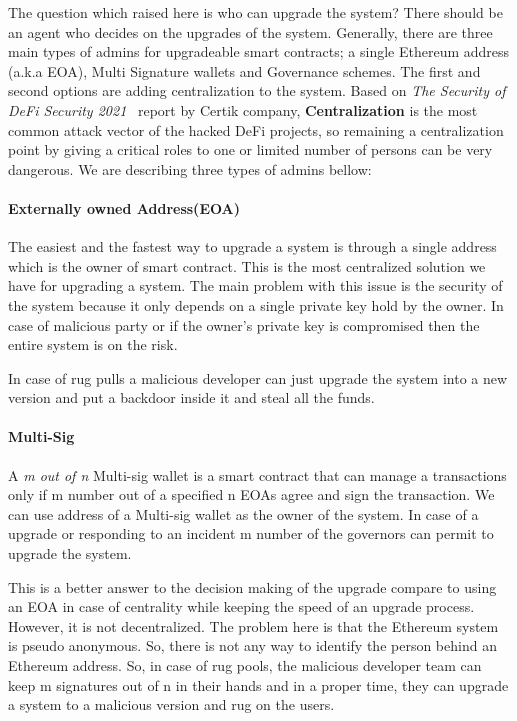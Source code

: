 
The question which raised here is who can upgrade the system? There should be an agent who decides on the upgrades of the system. Generally, there are three main types of admins for upgradeable smart contracts; a single Ethereum address (a.k.a EOA), Multi Signature wallets and Governance schemes. The first and second options are adding centralization to the system. Based on \textit{The Security of DeFi Security 2021}~\cite{certikReport} report by Certik company, \textbf{Centralization} is the most common attack vector of the hacked DeFi projects, so remaining a centralization point by giving a critical roles to one or limited number of persons can be very dangerous.
We are describing three types of admins bellow:


 \paragraph{Externally owned Address(EOA)}
The easiest and the fastest way to upgrade a system is through a single address which is the owner of smart contract. This is the most centralized solution we have for upgrading a system. The main problem with this issue is the security of the system because it only depends on a single private key hold by the owner. In case of malicious party or if the owner's private key is compromised then the entire system is on the risk.

In case of rug pulls a malicious developer can just upgrade the system into a new version and put a backdoor inside it and steal all the funds.
 \paragraph{Multi-Sig}
 A \textit{m out of n} Multi-sig wallet is a smart contract that can manage a transactions only if m number out of a specified n EOAs agree and sign the transaction. We can use address of a Multi-sig wallet as the owner of the system. In case of a upgrade or responding to an incident m number of the governors can permit to upgrade the system.

 This is a better answer to the decision making of the upgrade compare to using an EOA in case of centrality while keeping the speed of an upgrade process. However, it is not decentralized. The problem here is that the Ethereum system is pseudo anonymous. So, there is not any way to identify the person behind an Ethereum address. So, in case of rug pools, the malicious developer team can keep m signatures out of n in their hands and in a proper time, they can upgrade a system to a malicious version and rug on the users.

